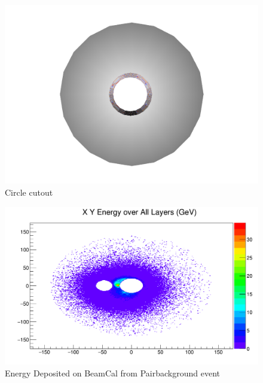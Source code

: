 \documentclass{report}
\begin{document}
\begin{figure}[h]
\begin{minipage}{0.3\textwidth}
                        \label{fig:beamcal_wedge}
                    \end{minipage}
                    \begin{minipage}{0.3\textwidth}
                        \includegraphics[width=\textwidth]{beamcal_circle}
                        \caption{Circle cutout}
                        \label{fig:beamcal_circle}
                    \end{minipage}
                \end{figure}

                \begin{figure}[h]
                    \centering
                    \includegraphics[width=\textwidth]{beamcal_energy_xy}
                    \caption{Energy Deposited on BeamCal from Pairbackground event}
                    \label{fig:beamcal_energy_xy}
                \end{figure}
\end{document}
